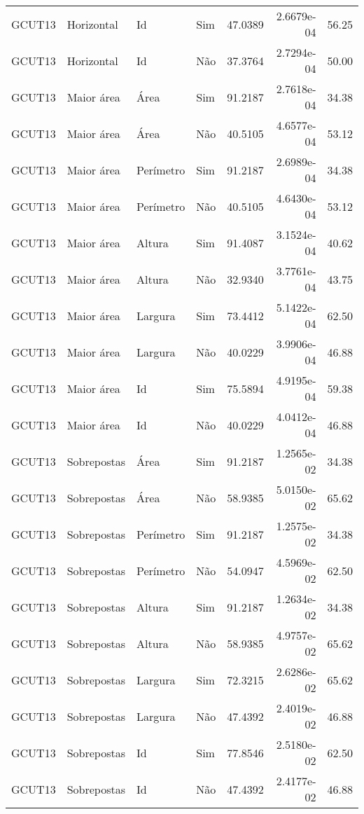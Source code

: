 \begin{tabular}{llllrrr}
    GCUT13    & Horizontal  & Id        & Sim         & 47.0389      & 2.6679e-04 & 56.25    \\
    GCUT13    & Horizontal  & Id        & Não         & 37.3764      & 2.7294e-04 & 50.00    \\
    GCUT13    & Maior área  & Área      & Sim         & 91.2187      & 2.7618e-04 & 34.38    \\
    GCUT13    & Maior área  & Área      & Não         & 40.5105      & 4.6577e-04 & 53.12    \\
    GCUT13    & Maior área  & Perímetro & Sim         & 91.2187      & 2.6989e-04 & 34.38    \\
    GCUT13    & Maior área  & Perímetro & Não         & 40.5105      & 4.6430e-04 & 53.12    \\
    GCUT13    & Maior área  & Altura    & Sim         & 91.4087      & 3.1524e-04 & 40.62    \\
    GCUT13    & Maior área  & Altura    & Não         & 32.9340      & 3.7761e-04 & 43.75    \\
    GCUT13    & Maior área  & Largura   & Sim         & 73.4412      & 5.1422e-04 & 62.50    \\
    GCUT13    & Maior área  & Largura   & Não         & 40.0229      & 3.9906e-04 & 46.88    \\
    GCUT13    & Maior área  & Id        & Sim         & 75.5894      & 4.9195e-04 & 59.38    \\
    GCUT13    & Maior área  & Id        & Não         & 40.0229      & 4.0412e-04 & 46.88    \\
    GCUT13    & Sobrepostas & Área      & Sim         & 91.2187      & 1.2565e-02 & 34.38    \\
    GCUT13    & Sobrepostas & Área      & Não         & 58.9385      & 5.0150e-02 & 65.62    \\
    GCUT13    & Sobrepostas & Perímetro & Sim         & 91.2187      & 1.2575e-02 & 34.38    \\
    GCUT13    & Sobrepostas & Perímetro & Não         & 54.0947      & 4.5969e-02 & 62.50    \\
    GCUT13    & Sobrepostas & Altura    & Sim         & 91.2187      & 1.2634e-02 & 34.38    \\
    GCUT13    & Sobrepostas & Altura    & Não         & 58.9385      & 4.9757e-02 & 65.62    \\
    GCUT13    & Sobrepostas & Largura   & Sim         & 72.3215      & 2.6286e-02 & 65.62    \\
    GCUT13    & Sobrepostas & Largura   & Não         & 47.4392      & 2.4019e-02 & 46.88    \\
    GCUT13    & Sobrepostas & Id        & Sim         & 77.8546      & 2.5180e-02 & 62.50    \\
    GCUT13    & Sobrepostas & Id        & Não         & 47.4392      & 2.4177e-02 & 46.88    \\
    \hline
\end{tabular}